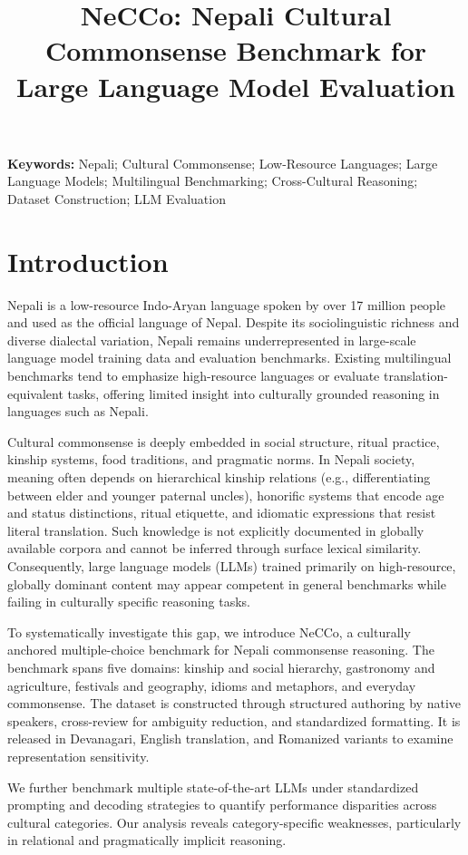 \documentclass[10pt, a4paper]{article}
\title{NeCCo: Nepali Cultural Commonsense Benchmark for Large Language Model Evaluation}
\begin{document}
\maketitleabstract

\vspace{-0.5em}
\noindent\textbf{Keywords:} Nepali; Cultural Commonsense; Low-Resource Languages; Large Language Models; Multilingual Benchmarking; Cross-Cultural Reasoning; Dataset Construction; LLM Evaluation

\section{Introduction}
Nepali is a low-resource Indo-Aryan language spoken by over 17 million people and used as the official language of Nepal. Despite its sociolinguistic richness and diverse dialectal variation, Nepali remains underrepresented in large-scale language model training data and evaluation benchmarks. Existing multilingual benchmarks tend to emphasize high-resource languages or evaluate translation-equivalent tasks, offering limited insight into culturally grounded reasoning in languages such as Nepali.

Cultural commonsense is deeply embedded in social structure, ritual practice, kinship systems, food traditions, and pragmatic norms. In Nepali society, meaning often depends on hierarchical kinship relations (e.g., differentiating between elder and younger paternal uncles), honorific systems that encode age and status distinctions, ritual etiquette, and idiomatic expressions that resist literal translation. Such knowledge is not explicitly documented in globally available corpora and cannot be inferred through surface lexical similarity. Consequently, large language models (LLMs) trained primarily on high-resource, globally dominant content may appear competent in general benchmarks while failing in culturally specific reasoning tasks.

To systematically investigate this gap, we introduce NeCCo, a culturally anchored multiple-choice benchmark for Nepali commonsense reasoning. The benchmark spans five domains: kinship and social hierarchy, gastronomy and agriculture, festivals and geography, idioms and metaphors, and everyday commonsense. The dataset is constructed through structured authoring by native speakers, cross-review for ambiguity reduction, and standardized formatting. It is released in Devanagari, English translation, and Romanized variants to examine representation sensitivity.

We further benchmark multiple state-of-the-art LLMs under standardized prompting and decoding strategies to quantify performance disparities across cultural categories. Our analysis reveals category-specific weaknesses, particularly in relational and pragmatically implicit reasoning.
\end{document}
